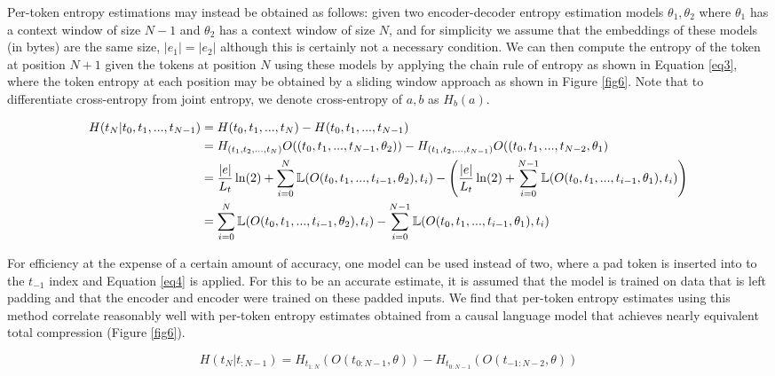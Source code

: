 \documentclass{article}
\begin{document}
    Per-token entropy estimations may instead be obtained as follows: given two encoder-decoder entropy estimation models $\theta_1, \theta_2$ where $\theta_1$ has a context window of size $N-1$ and $\theta_2$ has a context window of size $N$, and for simplicity we assume that the embeddings of these models (in bytes) are the same size, $\vert e_1 \vert = \vert e_2 \vert$ although this is certainly not a necessary condition. We can then compute the entropy of the token at position $N+1$ given the tokens at position $N$ using these models by applying the chain rule of entropy as shown in Equation \ref{eq3}, where the token entropy at each position may be obtained by a sliding window approach as shown in Figure \ref{fig6}. Note that to differentiate cross-entropy from joint entropy, we denote cross-entropy of $a, b$ as $H_b(a)$.

    \begin{equation}
        \begin{split}
       H(t_{N} \vert t_{0}, t_{1}, ..., t_{N-1}) & = H(t_0, t_1, ..., t_N) - H(t_0, t_1, ..., t_{N-1}) \\
        & = H_{(t_1, t_2, ..., t_{N})} O((t_0, t_1, ..., t_{N-1},  \theta_2))  - H_{(t_1, t_2, ..., t_{N-1})} O((t_0, t_1, ..., t_{N-2}, \theta_1) \\
        & = \frac{\vert e \vert}{L_t} \ln (2) + \sum_{i=0}^N \Bbb L(O(t_{0}, t_{1}, ..., t_{i-1}, \theta_2), t_i) - \left( \frac{\vert e \vert}{L_t} \ln (2)  + \sum_{i=0}^{N-1}\Bbb L(O(t_{0}, t_{1}, ..., t_{i-1}, \theta_1), t_i) \right) \\
        & = \sum_{i=0}^N \Bbb L(O(t_{0}, t_{1}, ..., t_{i-1}, \theta_2), t_i) -  \sum_{i=0}^{N-1}\Bbb L(O(t_{0}, t_{1}, ..., t_{i-1}, \theta_1), t_i)
        \end{split}
    \label{eq3}
    \end{equation}

    For efficiency at the expense of a certain amount of accuracy, one model can be used instead of two, where a pad token is inserted into to the $t_{-1}$ index and Equation \ref{eq4} is applied.  For this to be an accurate estimate, it is assumed that the model is trained on data that is left padding and that the encoder and encoder were trained on these padded inputs. We find that per-token entropy estimates using this method correlate reasonably well with per-token entropy estimates obtained from a causal language model that achieves nearly equivalent total compression (Figure \ref{fig6}). 

    \begin{equation}
    H(t_{N} \vert t_{:N-1}) = H_{t_{1:N}} (O(t_{0:N-1}, \theta)) - H_{ t_{0: N-1}}\left( O(t_{-1:N-2}, \theta) \right)
    \label{eq4}
    \end{equation}
\end{document}
